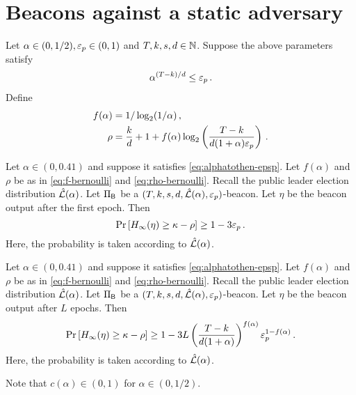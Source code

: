 \section{Beacons against a static adversary}

Let $\alpha \in (0, 1/2), \mathsf{\varepsilon}_p \in (0, 1)$ and $T, k, s, d \in \mathbb{N}$.
Suppose the above parameters satisfy 
\begin{align}\label{eq:alphatothen-epsp}
  \alpha^{(T-k)/d} \leq \mathsf{\varepsilon}_p
  \,.
\end{align}
Define 
\begin{align}
  f(\alpha)&= 1/\log_2(1/\alpha)\,, \label{eq:f-bernoulli} \\
  \rho &= \frac{k}{d} + 1 + f(\alpha) \log_2 \left(\frac{T-k}{d (1+\alpha) \mathsf{\varepsilon}_p } \right)
  \,. \label{eq:rho-bernoulli}
\end{align}

\begin{theorem}\label{thm:beacon-bernoulli-single-epoch}
  Let $\alpha \in (0, 0.41)$ and suppose it satisfies \eqref{eq:alphatothen-epsp}.
  Let $f(\alpha)$ and $\rho$ be as in \eqref{eq:f-bernoulli} and \eqref{eq:rho-bernoulli}.
  Recall the public leader election distribution $\hat{\mathcal{L}}(\alpha)$.
  Let $\Pi_{\mathsf{B}}$ be a $(T,k,s,d,\hat{\mathcal{L}}(\alpha), \mathsf{\varepsilon}_p)$-beacon.
  Let $\eta$ be the beacon output after the first epoch. 
  Then 
  \begin{equation}\label{eq:security-bernoulli-single-epoch}
    \Pr\left[H_\infty(\eta) \geq \kappa - \rho \right] \geq 1 - 3 \mathsf{\varepsilon}_p
    \,.
  \end{equation}
  Here, the probability is taken according to $\hat{\mathcal{L}}(\alpha)$.
\end{theorem}


\begin{theorem}\label{thm:beacon-bernoulli-multi-epoch}
  Let $\alpha \in (0, 0.41)$ and suppose it satisfies \eqref{eq:alphatothen-epsp}.
  Let $f(\alpha)$ and $\rho$ be as in \eqref{eq:f-bernoulli} and \eqref{eq:rho-bernoulli}.
  Recall the public leader election distribution $\hat{\mathcal{L}}(\alpha)$.
  Let $\Pi_{\mathsf{B}}$ be a $(T,k,s,d,\hat{\mathcal{L}}(\alpha), \mathsf{\varepsilon}_p)$-beacon.
  Let $\eta$ be the beacon output after $L$ epochs. 
  Then 
  \begin{equation}\label{eq:security-bernoulli-multi-epoch}
    \Pr\left[H_\infty(\eta) \geq \kappa - \rho \right] 
      \geq 1 - 3 L
        \left( \frac{T-k}{d(1+\alpha)}\right)^{f(\alpha)}
        \mathsf{\varepsilon}_p^{1-f(\alpha)}
    \,.
  \end{equation}
  Here, the probability is taken according to $\hat{\mathcal{L}}(\alpha)$.
\end{theorem}
\noindent
Note that $c(\alpha) \in (0,1)$ for $\alpha \in (0,1/2)$.



